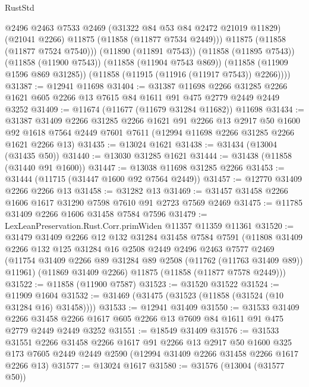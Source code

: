 \begin{lexlean}{RustStd}
\begin{coremodule}
            @2496
            @2463
            @7533
            @2469
            (@31322 @84 @53 @84 @2472 @21019 @11829)
            (@21041 @2266)
            @11875
            (@11858 (@11877 @7534 @2449)))
          @11875
          (@11858 (@11877 @7524 @7540)))
        (@11890 (@11891 @7543))
        (@11858 (@11895 @7543))
        (@11858 (@11900 @7543))
        (@11858 (@11904 @7543 @869))
        (@11858 (@11909 @1596 @869 @31285))
        (@11858 (@11915 (@11916 (@11917 @7543)) @2266))))
@31387 := @12941 @11698
@31404 := @31387
    @11698
    @2266
    @31285
    @2266
    @1621
    @605
    @2266
    @13
    @7615
    @84
    @1611
    @91
    @475
    @2779
    @2449
    @2449
    @3252
@31409 := @11674 (@11677 (@11679 @31284 @11682)) @11698
@31434 := @31387
    @31409
    @2266
    @31285
    @2266
    @1621
    @91
    @2266
    @13
    @2917
    @50
    @1600
    @92
    @1618
    @7564
    @2449
    @7601
    @7611
    (@12994 @11698 @2266 @31285 @2266 @1621 @2266 @13)
@31435 := @13024 @1621
@31438 := @31434 (@13004 (@31435 @50))
@31440 := @13030 @31285 @1621
@31444 := @31438 (@11858 (@31440 @91 @1600))
@31447 := @13038 @11698 @31285 @2266
@31453 := @31444 (@11715 (@31447 @1600 @92 @7564 @2449))
@31457 := @12770 @31409 @2266 @2266 @13
@31458 := @31282 @13
@31469 := @31457 @31458 @2266 @1606 @1617 @31290 @7598 @7610 @91 @2723 @7569 @2469
@31475 := @11785 @31409 @2266 @1606 @31458 @7584 @7596
@31479 := LexLeanPreservation.Rust.Corr.primWiden @11357 @11359 @11361
@31520 := @31479
    @31409
    @2266
    @12
    @132
    @31284
    @31458
    @7584
    @7591
    (@11808
      @31409
      @2266
      @132
      @125
      @31284
      @16
      @2508
      @2449
      @2496
      @2463
      @7577
      @2469
      (@11754 @31409 @2266 @89 @31284 @89 @2508 (@11762 (@11763 @31409 @89)) @11961)
      (@11869 @31409 @2266)
      @11875
      (@11858 (@11877 @7578 @2449)))
@31522 := @11858 (@11900 @7587)
@31523 := @31520 @31522
@31524 := @11909 @1604
@31532 := @31469 (@31475 (@31523 (@11858 (@31524 (@10 @31284 @16) @31458))))
@31533 := @12941 @31409
@31550 := @31533
    @31409
    @2266
    @31458
    @2266
    @1617
    @605
    @2266
    @13
    @7609
    @84
    @1611
    @91
    @475
    @2779
    @2449
    @2449
    @3252
@31551 := @18549 @31409
@31576 := @31533
    @31551
    @2266
    @31458
    @2266
    @1617
    @91
    @2266
    @13
    @2917
    @50
    @1600
    @325
    @173
    @7605
    @2449
    @2449
    @2590
    (@12994 @31409 @2266 @31458 @2266 @1617 @2266 @13)
@31577 := @13024 @1617
@31580 := @31576 (@13004 (@31577 @50))

\end{coremodule}
\end{lexlean}
